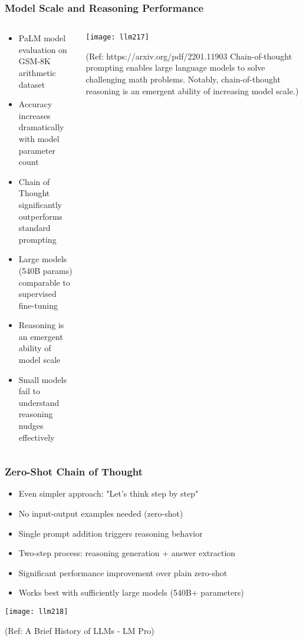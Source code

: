 \begin{frame}[fragile]\frametitle{Model Scale and Reasoning Performance}
\begin{columns}
    \begin{column}[T]{0.6\linewidth}
      \begin{itemize}
        \item PaLM model evaluation on GSM-8K arithmetic dataset
        \item Accuracy increases dramatically with model parameter count
        \item Chain of Thought significantly outperforms standard prompting
        \item Large models (540B params) comparable to supervised fine-tuning
        \item Reasoning is an emergent ability of model scale
        \item Small models fail to understand reasoning nudges effectively
      \end{itemize}
    \end{column}
    \begin{column}[T]{0.4\linewidth}
        \begin{center}
        \texttt{[image: llm217]}
		
		{\tiny (Ref: https://arxiv.org/pdf/2201.11903  Chain-of-thought prompting enables
large language models to solve challenging math problems. Notably, chain-of-thought reasoning is an emergent ability of increasing model scale.)}
        \end{center}	
    \end{column}
  \end{columns}
\end{frame}

\begin{frame}[fragile]\frametitle{Zero-Shot Chain of Thought}

      \begin{itemize}
        \item Even simpler approach: "Let's think step by step"
        \item No input-output examples needed (zero-shot)
        \item Single prompt addition triggers reasoning behavior
        \item Two-step process: reasoning generation + answer extraction
        \item Significant performance improvement over plain zero-shot
        \item Works best with sufficiently large models (540B+ parameters)
      \end{itemize}

        \begin{center}
        \texttt{[image: llm218]}
		
		{\tiny (Ref: A Brief History of LLMs - LM Pro)}
        \end{center}	

\end{frame}

